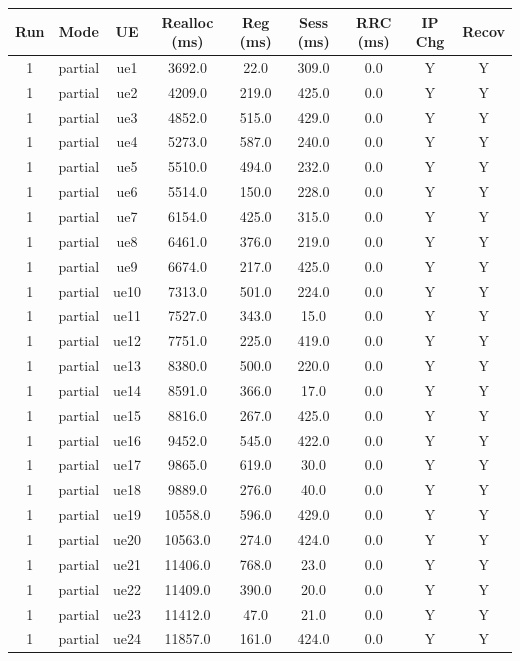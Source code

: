 \begin{table}[ht]
\centering
\begin{tabular}{|c|c|c|c|c|c|c|c|c|}
\hline
Run & Mode & UE & Realloc (ms) & Reg (ms) & Sess (ms) & RRC (ms) & IP Chg & Recov \\
\hline
1 & partial & ue1 & 3692.0 & 22.0 & 309.0 & 0.0 & Y & Y \\
1 & partial & ue2 & 4209.0 & 219.0 & 425.0 & 0.0 & Y & Y \\
1 & partial & ue3 & 4852.0 & 515.0 & 429.0 & 0.0 & Y & Y \\
1 & partial & ue4 & 5273.0 & 587.0 & 240.0 & 0.0 & Y & Y \\
1 & partial & ue5 & 5510.0 & 494.0 & 232.0 & 0.0 & Y & Y \\
1 & partial & ue6 & 5514.0 & 150.0 & 228.0 & 0.0 & Y & Y \\
1 & partial & ue7 & 6154.0 & 425.0 & 315.0 & 0.0 & Y & Y \\
1 & partial & ue8 & 6461.0 & 376.0 & 219.0 & 0.0 & Y & Y \\
1 & partial & ue9 & 6674.0 & 217.0 & 425.0 & 0.0 & Y & Y \\
1 & partial & ue10 & 7313.0 & 501.0 & 224.0 & 0.0 & Y & Y \\
1 & partial & ue11 & 7527.0 & 343.0 & 15.0 & 0.0 & Y & Y \\
1 & partial & ue12 & 7751.0 & 225.0 & 419.0 & 0.0 & Y & Y \\
1 & partial & ue13 & 8380.0 & 500.0 & 220.0 & 0.0 & Y & Y \\
1 & partial & ue14 & 8591.0 & 366.0 & 17.0 & 0.0 & Y & Y \\
1 & partial & ue15 & 8816.0 & 267.0 & 425.0 & 0.0 & Y & Y \\
1 & partial & ue16 & 9452.0 & 545.0 & 422.0 & 0.0 & Y & Y \\
1 & partial & ue17 & 9865.0 & 619.0 & 30.0 & 0.0 & Y & Y \\
1 & partial & ue18 & 9889.0 & 276.0 & 40.0 & 0.0 & Y & Y \\
1 & partial & ue19 & 10558.0 & 596.0 & 429.0 & 0.0 & Y & Y \\
1 & partial & ue20 & 10563.0 & 274.0 & 424.0 & 0.0 & Y & Y \\
1 & partial & ue21 & 11406.0 & 768.0 & 23.0 & 0.0 & Y & Y \\
1 & partial & ue22 & 11409.0 & 390.0 & 20.0 & 0.0 & Y & Y \\
1 & partial & ue23 & 11412.0 & 47.0 & 21.0 & 0.0 & Y & Y \\
1 & partial & ue24 & 11857.0 & 161.0 & 424.0 & 0.0 & Y & Y \\

\end{tabular}
\end{table}
